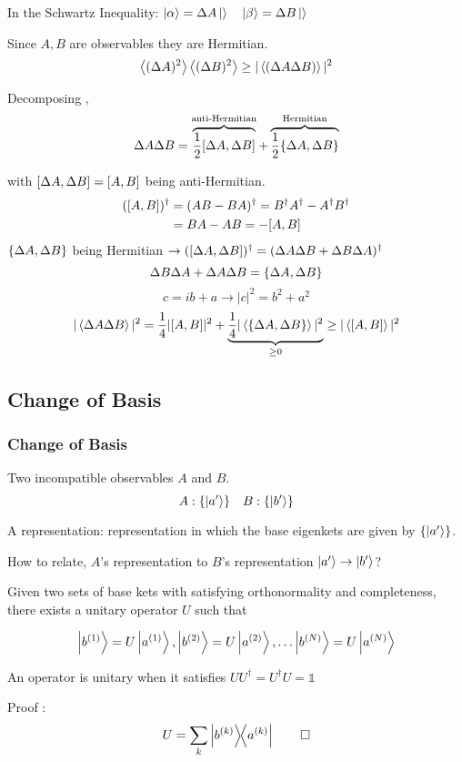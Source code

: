 \begin{frame}
	In the Schwartz Inequality:  $ \ket{\alpha} = \Delta A \ket{} \quad \ket\beta = \Delta B \ket{}$

	Since $A,B$ are observables they are Hermitian. $$\ev{(\Delta A)^2}\ev{(\Delta B)^2} \ge |\ev{(\Delta A \Delta B)}|^2$$

	Decomposing ,
	\begin{gather*}
		\Delta A \Delta B = \overbrace{\frac{1}{2}\comm{\Delta A}{\Delta B}}^{\text{anti-Hermitian}} + \overbrace{\frac{1}{2} \acomm{\Delta A}{\Delta B}}^{\text{Hermitian}}
	\end{gather*}
\end{frame}
\begin{frame}
	with $\comm{\Delta A}{\Delta B} = \comm{A }{B }$ being anti-Hermitian.
	\begin{align*}
		(\comm{A}{B})^\dag & = (AB - BA)^\dag = B^\dag A^\dag - A^\dag B^\dag \\
		                   & = BA - AB = -\comm{A}{B}
	\end{align*}
	$\acomm{\Delta A}{\Delta B}$ being Hermitian $\to (\comm{\Delta A}{\Delta B})^\dag = (\Delta A \Delta B + \Delta B \Delta A)^\dag$
	$$ \Delta B \Delta A + \Delta A \Delta B = \acomm{\Delta A}{\Delta B}$$
	\[
		c = ib + a \to |c|^2 = b^2+a^2
	\]
	\[
		|\ev{\Delta A \Delta B}|^2 = \frac14 |\comm{A}{B}|^2 + \underbrace{\frac14 |\ev{\acomm{\Delta A}{\Delta B}}|^2}_{\ge 0 } \ge |\ev{\comm{A}{B}}|^2
	\]

\end{frame}

\subsection{Change of Basis}
\begin{frame}
	\frametitle{Change of Basis}
	Two incompatible observables $A$ and $B$. \[A : \{\ket{a'}\} \quad B: \{\ket{b'}\}\]

	A representation: representation in which the base eigenkets are given by $\{ \ket{a'}\}$.

	How to relate, $A$'s  representation to $B$'s representation $\ket{a'} \to \ket{b'}$?

	\begin{theorem}[3]
		Given two sets of base kets with satisfying orthonormality and completeness, there exists a unitary operator
		$U$ such that

		\[
			\ket{b^{(1)}} = U \ket{a^{(1)}},\ket{b^{(2)}} = U \ket{a^{(2)}}, \dots \ket{b^{(N)}} = U \ket{a^{(N)}}
		\]
	\end{theorem}
	An operator is unitary when it satisfies $UU^\dag = U^\dag U = \mathbb{1}$

	Proof :
	\[
		U= \sum_k \op{b^{(k)}}{a^{(k)}} \qed
	\]

\end{frame}

